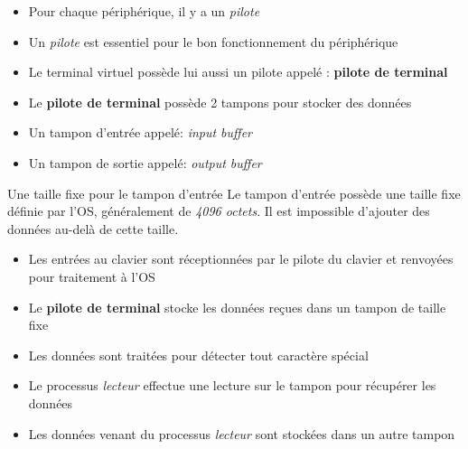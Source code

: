 \begin{frame}	
	\begin{itemize}[<+->]
		\item Pour chaque périphérique, il y a un \textit{pilote}
        
		\item Un \textit{pilote} est essentiel pour le bon fonctionnement du périphérique
        
		\item Le terminal virtuel possède lui aussi un pilote appelé : \textbf{pilote de terminal}
	\end{itemize}

\end{frame}

\begin{frame}
	\begin{itemize}[<+->]
		\item Le \textbf{pilote de terminal} possède 2 tampons pour stocker des données

		\item Un tampon d'entrée appelé: \textit{input buffer}

		\item Un tampon de sortie appelé: \textit{output buffer}

	\end{itemize}

	\begin{block}{Une taille fixe pour le tampon d'entrée}
		Le tampon d'entrée possède une taille fixe définie par l'OS, généralement de \textit{4096 octets}. Il est impossible d'ajouter des données au-delà de cette taille.
	\end{block}
\end{frame}

\begin{frame}
	\begin{itemize}[<+->]
		\item Les entrées au clavier sont réceptionnées par le pilote du clavier et renvoyées pour traitement à l'OS
		\item Le \textbf{pilote de terminal} stocke les données reçues dans un tampon de taille fixe
		\item Les données sont traitées pour détecter tout caractère spécial

\item Le processus \textit{lecteur} effectue une lecture sur le tampon pour récupérer les données

\item Les données venant du processus \textit{lecteur} sont stockées dans un autre tampon
	\end{itemize}
\end{frame}

